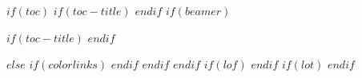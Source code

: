 $if(toc)$
$if(toc-title)$
$endif$
$if(beamer)$
\begin{frame}[allowframebreaks]
$if(toc-title)$
$endif$
\end{frame}
$else$
{
$if(colorlinks)$
\hypersetup{linkcolor=$if(toccolor)$$toccolor$$else$$endif$}
$endif$
}
$endif$
$endif$
$if(lof)$
$endif$
$if(lot)$
$endif$

